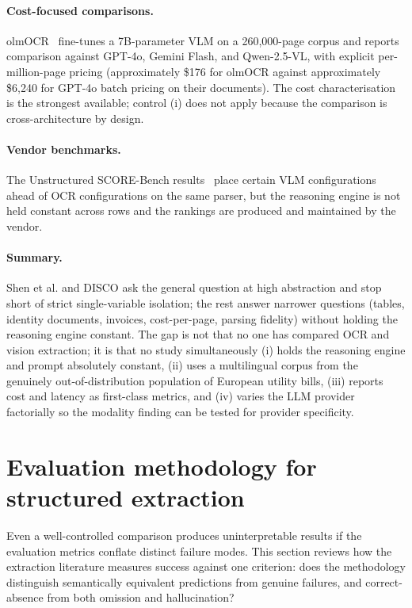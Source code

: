 \paragraph{Cost-focused comparisons.} olmOCR~\cite{poznanski2025olmocr}
fine-tunes a 7B-parameter VLM on a 260{,}000-page corpus and reports
comparison against GPT-4o, Gemini Flash, and Qwen-2.5-VL, with
explicit per-million-page pricing (approximately \$176 for olmOCR
against approximately \$6{,}240 for GPT-4o batch pricing on their
documents). The cost characterisation is the strongest available;
control (i) does not apply because the comparison is
cross-architecture by design.

\paragraph{Vendor benchmarks.} The Unstructured SCORE-Bench
results~\cite{unstructured2025scorebench} place certain VLM
configurations ahead of OCR configurations on the same parser, but
the reasoning engine is not held constant across rows and the
rankings are produced and maintained by the vendor.

\paragraph{Summary.} Shen et al. and DISCO ask the general question
at high abstraction and stop short of strict single-variable
isolation; the rest answer narrower questions (tables, identity
documents, invoices, cost-per-page, parsing fidelity) without holding
the reasoning engine constant. The gap is not that no one has
compared OCR and vision extraction; it is that no study
simultaneously (i) holds the reasoning engine and prompt absolutely
constant, (ii) uses a multilingual corpus from the genuinely
out-of-distribution population of European utility bills, (iii)
reports cost and latency as first-class metrics, and (iv) varies the
LLM provider factorially so the modality finding can be tested for
provider specificity.

\section{Evaluation methodology for structured extraction}
\label{sec:lr-eval}

Even a well-controlled comparison produces uninterpretable results if
the evaluation metrics conflate distinct failure modes. This section
reviews how the extraction literature measures success against one
criterion: does the methodology distinguish semantically equivalent
predictions from genuine failures, and correct-absence from both
omission and hallucination?

